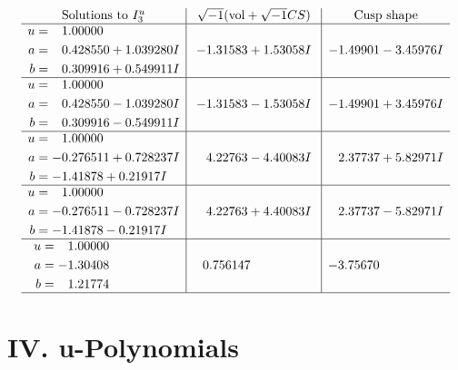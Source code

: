 \documentclass[1p]{elsarticle_modified}
\theoremstyle{definition}
\newcommand{\I}{\sqrt{-1}}
\begin{document}
$$\begin{array}{c|c|c}  
\text{Solutions to }I^u_{3}& \I (\text{vol} + \sqrt{-1}CS) & \text{Cusp shape}\\
 \hline 
\begin{aligned}
u &= \phantom{-}1.00000\phantom{ +0.000000I} \\
a &= \phantom{-}0.428550 + 1.039280 I \\
b &= \phantom{-}0.309916 + 0.549911 I\end{aligned}
 & -1.31583 + 1.53058 I & -1.49901 - 3.45976 I \\ \hline\begin{aligned}
u &= \phantom{-}1.00000\phantom{ +0.000000I} \\
a &= \phantom{-}0.428550 - 1.039280 I \\
b &= \phantom{-}0.309916 - 0.549911 I\end{aligned}
 & -1.31583 - 1.53058 I & -1.49901 + 3.45976 I \\ \hline\begin{aligned}
u &= \phantom{-}1.00000\phantom{ +0.000000I} \\
a &= -0.276511 + 0.728237 I \\
b &= -1.41878 + 0.21917 I\end{aligned}
 & \phantom{-}4.22763 - 4.40083 I & \phantom{-}2.37737 + 5.82971 I \\ \hline\begin{aligned}
u &= \phantom{-}1.00000\phantom{ +0.000000I} \\
a &= -0.276511 - 0.728237 I \\
b &= -1.41878 - 0.21917 I\end{aligned}
 & \phantom{-}4.22763 + 4.40083 I & \phantom{-}2.37737 - 5.82971 I \\ \hline\begin{aligned}
u &= \phantom{-}1.00000\phantom{ +0.000000I} \\
a &= -1.30408\phantom{ +0.000000I} \\
b &= \phantom{-}1.21774\phantom{ +0.000000I}\end{aligned}
 & \phantom{-}0.756147\phantom{ +0.000000I} & -3.75670\phantom{ +0.000000I}\\
 \hline 
 \end{array}$$\newpage
\newpage\renewcommand{\arraystretch}{1}
\centering \section*{ IV. u-Polynomials}
\end{document}
